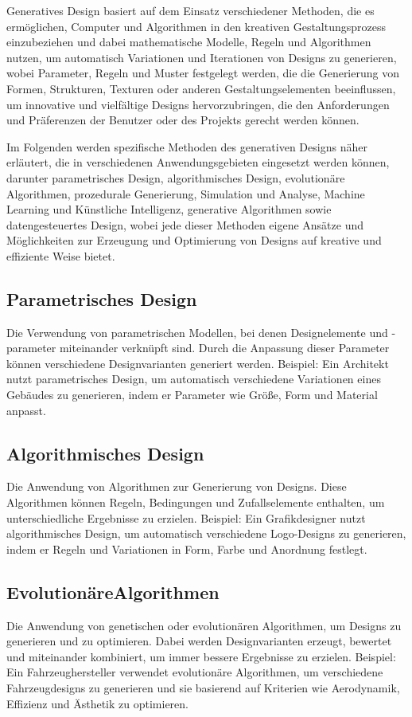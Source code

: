 Generatives Design basiert auf dem Einsatz verschiedener Methoden, die es ermöglichen, Computer und Algorithmen in den kreativen Gestaltungsprozess einzubeziehen und dabei mathematische Modelle, Regeln und Algorithmen nutzen, um automatisch Variationen und Iterationen von Designs zu generieren, wobei Parameter, Regeln und Muster festgelegt werden, die die Generierung von Formen, Strukturen, Texturen oder anderen Gestaltungselementen beeinflussen, um innovative und vielfältige Designs hervorzubringen, die den Anforderungen und Präferenzen der Benutzer oder des Projekts gerecht werden können.

Im Folgenden werden spezifische Methoden des generativen Designs näher erläutert, die in verschiedenen Anwendungsgebieten eingesetzt werden können, darunter parametrisches Design, algorithmisches Design, evolutionäre Algorithmen, prozedurale Generierung, Simulation und Analyse, Machine Learning und Künstliche Intelligenz, generative Algorithmen sowie datengesteuertes Design, wobei jede dieser Methoden eigene Ansätze und Möglichkeiten zur Erzeugung und Optimierung von Designs auf kreative und effiziente Weise bietet.

\subsection*{Parametrisches Design}
Die Verwendung von parametrischen Modellen, bei denen Designelemente und -parameter miteinander verknüpft sind. Durch die Anpassung dieser Parameter können verschiedene Designvarianten generiert werden. Beispiel: Ein Architekt nutzt parametrisches Design, um automatisch verschiedene Variationen eines Gebäudes zu generieren, indem er Parameter wie Größe, Form und Material anpasst.

\subsection*{Algorithmisches Design}
Die Anwendung von Algorithmen zur Generierung von Designs. Diese Algorithmen können Regeln, Bedingungen und Zufallselemente enthalten, um unterschiedliche Ergebnisse zu erzielen. Beispiel: Ein Grafikdesigner nutzt algorithmisches Design, um automatisch verschiedene Logo-Designs zu generieren, indem er Regeln und Variationen in Form, Farbe und Anordnung festlegt.

\subsection*{EvolutionäreAlgorithmen}
Die Anwendung von genetischen oder evolutionären Algorithmen, um Designs zu generieren und zu optimieren. Dabei werden Designvarianten erzeugt, bewertet und miteinander kombiniert, um immer bessere Ergebnisse zu erzielen. Beispiel: Ein Fahrzeughersteller verwendet evolutionäre Algorithmen, um verschiedene Fahrzeugdesigns zu generieren und sie basierend auf Kriterien wie Aerodynamik, Effizienz und Ästhetik zu optimieren.

